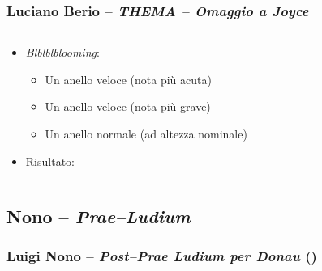 \documentclass[compress]{beamer}
\newcommand{\esdplay}[2]{\href{run: esdplay \exampledir/#1}{#2 \pgfuseimage{speaker}}}
\begin{document}
\begin{frame}
    \frametitle{Luciano Berio -- \emph{THEMA -- Omaggio a Joyce}} 

    \begin{columns}[T]
        \begin{column}{0.7\textwidth}
			    \begin{itemize}
			        \item \emph{Blblblblooming}:
			
			            \begin{itemize}
			                \item Un anello veloce (nota pi\`u acuta)
			                \item Un anello veloce (nota pi\`u grave)
			                \item Un anello normale (ad altezza nominale)
			            \end{itemize}
			
			        \item \esdplay{Blblblbooming.wav}{Risultato:}
			
			    \end{itemize}
        \end{column}
        \begin{column}{0.3\textwidth}
        \end{column}
    \end{columns}
        
\end{frame}

\subsection{Nono -- {\it Prae--Ludium}}

\setcounter{ms}{0}
\begin{frame}
    \frametitle{Luigi Nono -- \emph{Post--Prae Ludium per Donau} ()} 

    \begin{center}
       \\[0.5\baselineskip]
    \end{center}

\end{frame}
\end{document}
